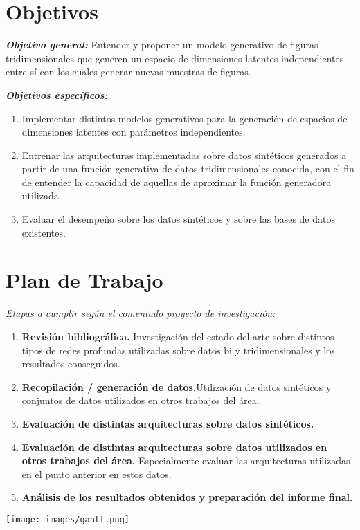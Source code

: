 \documentclass[spanish]{article}
\begin{document}
\section{Objetivos}
\textbf{\textit{Objetivo general:}} Entender y proponer un modelo generativo de figuras tridimensionales
que generen un espacio de dimensiones latentes independientes entre sí con los cuales generar nuevas
muestras de figuras.

\textbf{\textit{Objetivos específicos:}}
\begin{enumerate}
   \item Implementar distintos modelos generativos para la generación de espacios de dimensiones latentes
	   con parámetros independientes.
   \item Entrenar las arquitecturas implementadas sobre datos sintéticos generados a partir de una
	   función generativa de datos tridimensionales conocida, con el fin de entender la capacidad de
	   aquellas de aproximar la función generadora utilizada.
   \item Evaluar el desempeño sobre los datos sintéticos y sobre las bases de datos existentes. 
\end{enumerate}

\section{Plan de Trabajo}
\textit{Etapas a cumplir según el comentado proyecto de investigación:}
\begin{enumerate}
   \item \textbf{Revisión bibliográfica.} Investigación del estado del arte sobre distintos tipos de redes
	   profundas utilizadas sobre datos bi y tridimensionales y los resultados conseguidos.
   \item \textbf{Recopilación / generación de datos.}Utilización de datos sintéticos y conjuntos de datos
	   utilizados en otros trabajos del área.
   \item \textbf{Evaluación de distintas arquitecturas sobre datos sintéticos.}
   \item \textbf{Evaluación de distintas arquitecturas sobre datos utilizados en otros trabajos del área.}
	   Especialmente evaluar las arquitecturas utilizadas en el punto anterior en estos datos.
   \item \textbf{Análisis de los resultados obtenidos y preparación del informe final.}
\end{enumerate}
\begin{center}
   \texttt{[image: images/gantt.png]}
\end{center}



\end{document}
